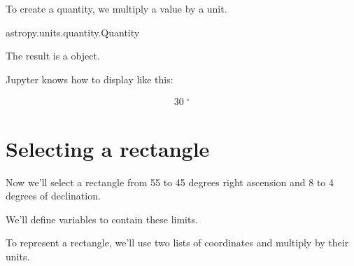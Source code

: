 \documentclass[letterpaper,10pt,english]{sphinxmanual}
\begin{document}
To create a quantity, we multiply a value by a unit.

\begin{sphinxVerbatim}[commandchars=\\\{\}]
    
\end{sphinxVerbatim}

\begin{sphinxVerbatim}[commandchars=\\\{\}]
astropy.units.quantity.Quantity
\end{sphinxVerbatim}

The result is a  object.

Jupyter knows how to display  like this:

\begin{sphinxVerbatim}[commandchars=\\\{\}]
\end{sphinxVerbatim}
\begin{equation*}
\begin{split}30 \; \mathrm{{}^{\circ}}\end{split}
\end{equation*}

\section{Selecting a rectangle}
\label{\detokenize{02_coords:selecting-a-rectangle}}
Now we’ll select a rectangle from \sphinxhyphen{}55 to \sphinxhyphen{}45 degrees right ascension and \sphinxhyphen{}8 to 4 degrees of declination.

We’ll define variables to contain these limits.

\begin{sphinxVerbatim}[commandchars=\\\{\}]
  
  
  
  
\end{sphinxVerbatim}

To represent a rectangle, we’ll use two lists of coordinates and multiply by their units.

\begin{sphinxVerbatim}[commandchars=\\\{\}]
  \PYG{p}{[}   \PYG{p}{]}  
  \PYG{p}{[}   \PYG{p}{]}  
\end{sphinxVerbatim}
\end{document}
